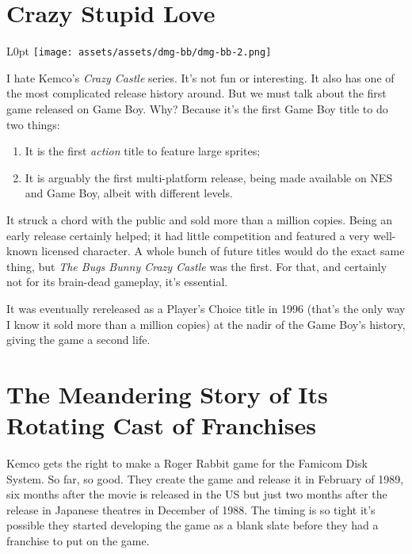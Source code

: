 \documentclass{book}
\begin{document}
\FloatBarrier\needspace{10mm}\section*{Crazy Stupid Love}\nopagebreak[4]

\begin{wrapfigure}{L}{0pt} \texttt{[image: assets/assets/dmg-bb/dmg-bb-2.png]}\end{wrapfigure}
I hate Kemco’s \emph{Crazy Castle} series. It’s not fun or interesting. It also has one of the most complicated release history around. But we must talk about the first game released on Game Boy. Why? Because it’s the first Game Boy title to do two things:

\begin{enumerate}
\item It is the first \emph{action} title to feature large sprites;
\item It is arguably the first multi-platform release, being made available on NES and Game Boy, albeit with different levels.
\end{enumerate}\noindent

It struck a chord with the public and sold more than a million copies. Being an early release certainly helped; it had little competition and featured a very well-known licensed character. A whole bunch of future titles would do the exact same thing, but \emph{The Bugs Bunny Crazy Castle} was the first. For that, and certainly not for its brain-dead gameplay, it’s essential.

It was eventually rereleased as a Player’s Choice title in 1996 (that’s the only way I know it sold more than a million copies) at the nadir of the Game Boy’s history, giving the game a second life.

\FloatBarrier\needspace{10mm}\section*{The Meandering Story of Its Rotating Cast of Franchises}\nopagebreak[4]

Kemco gets the right to make a Roger Rabbit game for the Famicom Disk System. So far, so good. They create the game and release it in February of 1989, six months after the movie is released in the US but just two months after the release in Japanese theatres in December of 1988. The timing is so tight it’s possible they started developing the game as a blank slate before they had a franchise to put on the game.
\end{document}
